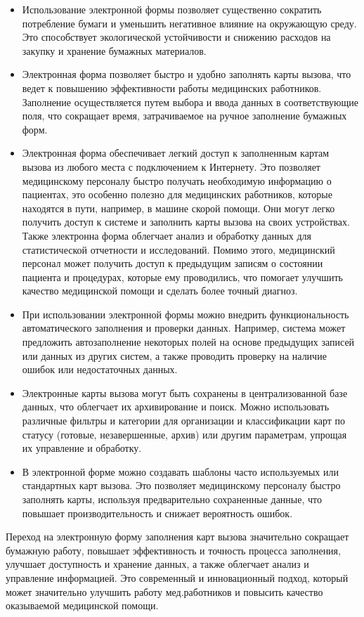 \begin{itemize}
    \item Использование электронной формы позволяет существенно сократить потребление бумаги и уменьшить негативное влияние на окружающую среду. Это способствует экологической устойчивости и снижению расходов на закупку и хранение бумажных материалов.
    \item Электронная форма позволяет быстро и удобно заполнять карты вызова, что ведет к повышению эффективности работы медицинских работников. Заполнение осуществляется путем выбора и ввода данных в соответствующие поля, что сокращает время, затрачиваемое на ручное заполнение бумажных форм.
    \item Электронная форма обеспечивает легкий доступ к заполненным картам вызова из любого места с подключением к Интернету. Это позволяет медицинскому персоналу быстро получать необходимую информацию о пациентах, это особенно полезно для медицинских работников, которые находятся в пути, например, в машине скорой помощи. Они могут легко получить доступ к системе и заполнить карты вызова на своих устройствах. Также электронна форма облегчает анализ и обработку данных для статистической отчетности и исследований. Помимо этого, медицинский персонал может получить доступ к предыдущим записям о состоянии пациента и процедурах, которые ему проводились, что помогает улучшить качество медицинской помощи и сделать более точный диагноз.
    \item При использовании электронной формы можно внедрить функциональность автоматического заполнения и проверки данных. Например, система может предложить автозаполнение некоторых полей на основе предыдущих записей или данных из других систем, а также проводить проверку на наличие ошибок или недостаточных данных.
    \item Электронные карты вызова могут быть сохранены в централизованной базе данных, что облегчает их архивирование и поиск. Можно использовать различные фильтры и категории для организации и классификации карт по статусу (готовые, незавершенные, архив) или другим параметрам, упрощая их управление и обработку.
    \item В электронной форме можно создавать шаблоны часто используемых или стандартных карт вызова. Это позволяет медицинскому персоналу быстро заполнять карты, используя предварительно сохраненные данные, что повышает производительность и снижает вероятность ошибок.
\end{itemize}

Переход на электронную форму заполнения карт вызова значительно сокращает бумажную работу, повышает эффективность и точность процесса заполнения, улучшает доступность и хранение данных, а также облегчает анализ и управление информацией. Это современный и инновационный подход, который может значительно улучшить работу мед.работников и повысить качество оказываемой медицинской помощи.
